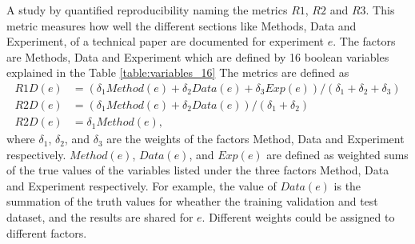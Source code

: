 \documentclass[
10pt, %
a4paper, %
oneside, %
headinclude,footinclude, %
BCOR5mm, %
]{scrartcl}
\begin{document}
A study by \cite{Gundersen2019} quantified reproducibility naming the metrics $R1$, $R2$ and $R3$. This metric measures how well the different sections like Methods, Data and Experiment, of a technical paper are documented for experiment $e$. The factors are Methods, Data and Experiment which are defined by 16 boolean variables explained in the Table \ref{table:variables_16} The metrics are defined as
\begin{align}
	R1D(e)&= (\delta_1 Method(e) +\delta_2 Data(e) +\delta_3 Exp(e))/(\delta_1+\delta_2+\delta_3)\\
	R2D(e)&= (\delta_1 Method(e) +\delta_2 Data(e))/(\delta_1+\delta_2)\\
	R2D(e)&= \delta_1 Method(e), 
\end{align}
where $\delta_1$, $\delta_2$, and $\delta_3$ are the weights of the factors Method, Data and Experiment respectively. 
$Method(e)$, $Data(e)$, and $Exp(e)$ are defined as weighted sums of the true values of the variables listed under the three factors Method, Data and Experiment respectively. 
For example, the value of $Data(e)$ is the summation of the truth values for wheather the training validation and test dataset, and the results are shared for $e$. Different weights could be assigned to different factors. 
\end{document}
